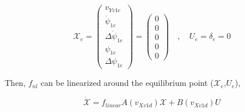 \documentclass[12pt]{article}
\begin{document}
\begin{equation}
    \mathcal{X}_e = \begin{pmatrix} v_{Yv1e} \\ \Dot{\psi}_{1e} \\ \Delta \Dot{\psi}_{1e} \\ \psi_{1e} \\ \Delta \psi_{1e} \end{pmatrix} = \begin{pmatrix} 0 \\ 0 \\ 0 \\ 0 \\ 0  \end{pmatrix} \quad , \quad U_e =  \delta_{e} =  0 
\end{equation}

Then, $f_{nl}$ can be linearized around the equilibrium point ($\mathcal{X}_e$,$U_e$),

\begin{equation} \label{linear_expression_state}
    \dot{\mathcal{X}} = f_{linear} A (v_{Xv1d}) \mathcal{X} + B (v_{Xv1d}) U
\end{equation}
\end{document}
